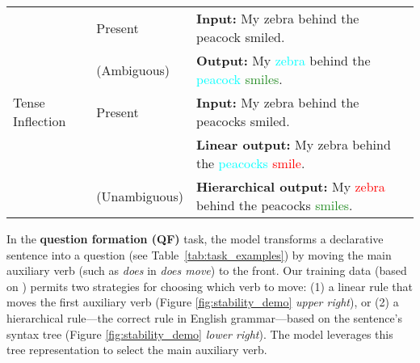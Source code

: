 \begin{table}[t]
{{\begin{tabular}{p{2.5cm} p{2.3cm} p{9cm}}
    \hline
    \multirow{5}{*}{Tense Inflection} & Present & \textbf{Input:} My zebra behind the peacock smiled. \\ 
                        & (Ambiguous) & \textbf{Output:} My \textcolor{cyan}{zebra} behind the \textcolor{cyan}{peacock}  \textcolor{ForestGreen}{smiles}.    \\
                        \cline{2-3} 
                        & \multirow{1.5}{*}{Present}   & \textbf{Input:} My zebra behind the peacocks smiled. \\ 
                        & & \textbf{Linear output:} My zebra behind the \textcolor{cyan}{peacocks} \textcolor{red}{smile}.     \\
                        &  (Unambiguous) & \textbf{Hierarchical output:} My \textcolor{red}{zebra} behind the peacocks \textcolor{ForestGreen}{smiles}.     \\
    \bottomrule
    \end{tabular}
    \vspace{-5px}
    }}
\end{table}


In the \textbf{question formation (QF)} task, the model transforms a declarative sentence into a question (see Table~\ref{tab:task_examples}) by moving the main auxiliary verb (such as \textit{does} in \textit{does move}) to the front. Our training data (based on \citet{McCoy2018-uv}) permits two strategies for choosing which verb to move: (1) a linear rule that moves the first auxiliary verb (Figure \ref{fig:stability_demo} \textit{upper right}), or (2) a hierarchical rule---the correct rule in English grammar---based on the sentence's syntax tree (Figure \ref{fig:stability_demo} \textit{lower right}). The model leverages this tree representation to select the main auxiliary verb.

